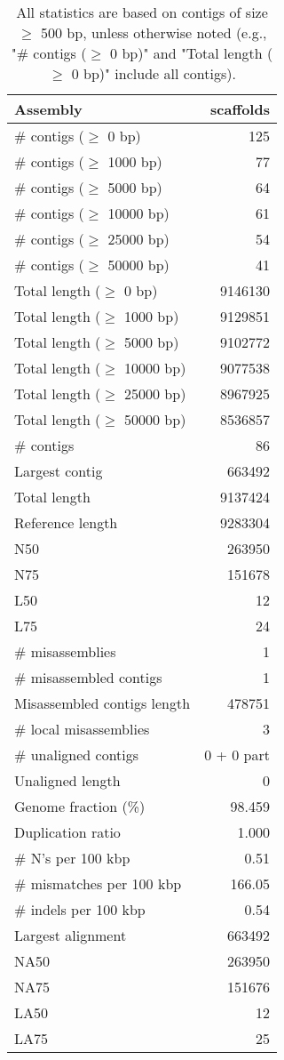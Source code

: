 \documentclass[12pt,a4paper]{article}
\begin{document}
\begin{table}[ht]
\begin{center}
\caption{All statistics are based on contigs of size $\geq$ 500 bp, unless otherwise noted (e.g., "\# contigs ($\geq$ 0 bp)" and "Total length ($\geq$ 0 bp)" include all contigs).}
\begin{tabular}{|l*{1}{|r}|}
\hline
Assembly & scaffolds \\ \hline
\# contigs ($\geq$ 0 bp) & 125 \\ \hline
\# contigs ($\geq$ 1000 bp) & 77 \\ \hline
\# contigs ($\geq$ 5000 bp) & 64 \\ \hline
\# contigs ($\geq$ 10000 bp) & 61 \\ \hline
\# contigs ($\geq$ 25000 bp) & 54 \\ \hline
\# contigs ($\geq$ 50000 bp) & 41 \\ \hline
Total length ($\geq$ 0 bp) & 9146130 \\ \hline
Total length ($\geq$ 1000 bp) & 9129851 \\ \hline
Total length ($\geq$ 5000 bp) & 9102772 \\ \hline
Total length ($\geq$ 10000 bp) & 9077538 \\ \hline
Total length ($\geq$ 25000 bp) & 8967925 \\ \hline
Total length ($\geq$ 50000 bp) & 8536857 \\ \hline
\# contigs & 86 \\ \hline
Largest contig & 663492 \\ \hline
Total length & 9137424 \\ \hline
Reference length & 9283304 \\ \hline
N50 & 263950 \\ \hline
N75 & 151678 \\ \hline
L50 & 12 \\ \hline
L75 & 24 \\ \hline
\# misassemblies & 1 \\ \hline
\# misassembled contigs & 1 \\ \hline
Misassembled contigs length & 478751 \\ \hline
\# local misassemblies & 3 \\ \hline
\# unaligned contigs & 0 + 0 part \\ \hline
Unaligned length & 0 \\ \hline
Genome fraction (\%) & 98.459 \\ \hline
Duplication ratio & 1.000 \\ \hline
\# N's per 100 kbp & 0.51 \\ \hline
\# mismatches per 100 kbp & 166.05 \\ \hline
\# indels per 100 kbp & 0.54 \\ \hline
Largest alignment & 663492 \\ \hline
NA50 & 263950 \\ \hline
NA75 & 151676 \\ \hline
LA50 & 12 \\ \hline
LA75 & 25 \\ \hline
\end{tabular}
\end{center}
\end{table}
\end{document}
